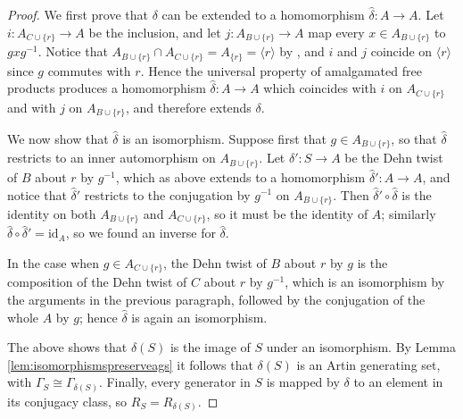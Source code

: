 \documentclass[svgnames]{amsart}
\theoremstyle{plain}
\theoremstyle{definition}
\begin{document}
\begin{proof}
    We first prove that $\delta$ can be extended to a homomorphism $\hat\delta\colon A\to A$. Let $i\colon A_{C\cup\{r\}}\to A$ be the inclusion, and let $j\colon A_{B\cup\{r\}}\to A$ map every $x\in A_{B\cup\{r\}}$ to $gxg^{-1}$. Notice that $A_{B\cup \{r\}}\cap A_{C\cup\{r\}}=A_{\{r\}}=\langle r\rangle$ by \cite{VanDerLek}, and $i$ and $j$ coincide on $\langle r\rangle$ since $g$ commutes with $r$. Hence the universal property of amalgamated free products produces a homomorphism $\hat\delta\colon A\to A$ which coincides with $i$ on $A_{C\cup\{r\}}$ and with $j$ on $A_{B\cup\{r\}}$, and therefore extends $\delta$. 

    We now show that $\hat\delta$ is an isomorphism. Suppose first that $g\in A_{B\cup\{r\}}$, so that $\hat\delta$ restricts to an inner automorphism on $A_{B\cup\{r\}}$. Let $\delta'\colon S\to A$ be the Dehn twist of $B$ about $r$ by $g^{-1}$, which as above extends to a homomorphism $\hat\delta'\colon A\to A$, and notice that $\hat\delta'$ restricts to the conjugation by $g^{-1}$ on $A_{B\cup\{r\}}$. Then $\hat\delta'\circ\hat\delta$ is the identity on both $A_{B\cup\{r\}}$ and $A_{C\cup\{r\}}$, so it must be the identity of $A$; similarly $\hat\delta\circ\hat\delta'=\text{id}_A$, so we found an inverse for $\hat\delta$.

    In the case when $g\in A_{C\cup\{r\}}$, the Dehn twist of $B$ about $r$ by $g$ is the composition of the Dehn twist of $C$ about $r$ by $g^{-1}$, which is an isomorphism by the arguments in the previous paragraph, followed by the conjugation of the whole $A$ by $g$; hence $\hat\delta$ is again an isomorphism.

    The above shows that $\delta(S)$ is the image of $S$ under an isomorphism. By Lemma \ref{lem:isomorphismspreserveags} it follows that $\delta(S)$ is an Artin generating set, with $\Gamma_S \cong \Gamma_{\delta(S)}$. Finally, every generator in $S$ is mapped by $\delta$ to an element in its conjugacy class, so $R_S=R_{\delta(S)}$.
    \end{proof}
\end{document}

